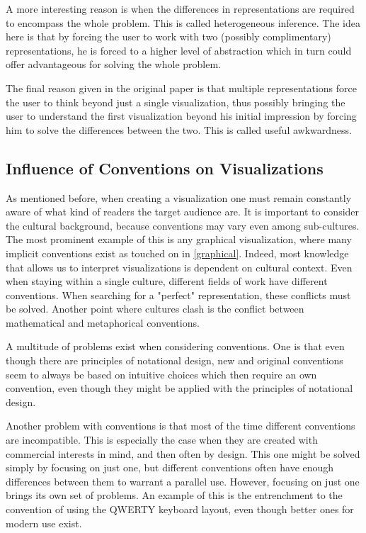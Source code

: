 \documentclass[11pt, a4paper, ngerman, twoside]{article}
\theoremstyle{plain}\newtheorem{Lemma}{Lemma}
\theoremstyle{plain}\newtheorem{Satz}[Lemma]{Satz}
\theoremstyle{definition}\newtheorem{Definition}[Lemma]{Definition}
\theoremstyle{definition}\newtheorem*{Beispiel}{Beispiel}
\theoremstyle{remark}\newtheorem*{Bemerkung}{Bemerkung}
\begin{document}
A more interesting reason is when the differences in representations are required to encompass the whole problem. This is called heterogeneous inference. The idea here is that by forcing the user to work with two (possibly complimentary) representations, he is forced to a higher level of abstraction which in turn could offer advantageous for solving the whole problem.

The final reason given in the original paper is that multiple representations force the user to think beyond just a single visualization, thus possibly bringing the user to understand the first visualization beyond his initial impression by forcing him to solve the differences between the two. This is called useful awkwardness.

\subsection{Influence of Conventions on Visualizations}

As mentioned before, when creating a visualization one must remain constantly aware of what kind of readers the target audience are. It is important to consider the cultural background, because conventions may vary even among sub-cultures. The most prominent example of this is any graphical visualization, where many implicit conventions exist as touched on in \ref{graphical}. Indeed, most knowledge that allows us to interpret visualizations is dependent on cultural context. Even when staying within a single culture, different fields of work have different conventions. When searching for a "perfect" representation, these conflicts must be solved. Another point where cultures clash is the conflict between mathematical and metaphorical conventions.

A multitude of problems exist when considering conventions. One is that even though there are principles of notational design, new and original conventions seem to always be based on intuitive choices which then require an own convention, even though they might be applied with the principles of notational design\cite{ro}.

Another problem with conventions is that most of the time different conventions are incompatible. This is especially the case when they are created with commercial interests in mind, and then often by design. This one might be solved simply by focusing on just one, but different conventions often have enough differences between them to warrant a parallel use. However, focusing on just one brings its own set of problems. An example of this is the entrenchment to the convention of using the QWERTY keyboard layout, even though better ones for modern use exist.
\end{document}
